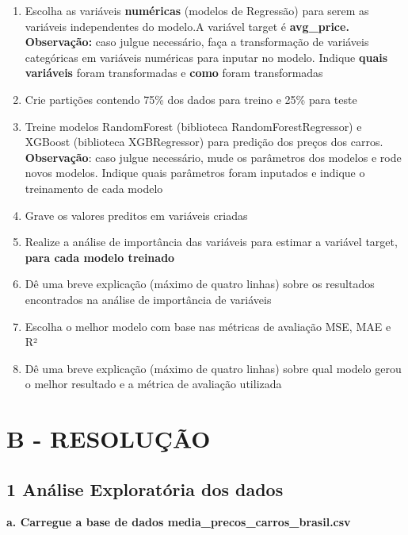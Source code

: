 \begin{enumerate}[series=listWWNumxii,label=\alph*.,ref=\alph*]
\item Escolha as variáveis \textbf{numéricas} (modelos de Regressão) para serem as variáveis independentes do modelo.A
variável target é \textbf{avg\_price. Observação:} caso julgue necessário, faça a transformação de variáveis
categóricas em variáveis numéricas para inputar no modelo. Indique \textbf{quais variáveis} foram transformadas e
\textbf{como} foram transformadas
\item Crie partições contendo 75\% dos dados para treino e 25\% para teste
\item Treine modelos RandomForest (biblioteca RandomForestRegressor) e XGBoost (biblioteca XGBRegressor) para predição
dos preços dos carros. \textbf{Observação}: caso julgue necessário, mude os parâmetros dos modelos e rode novos
modelos. Indique quais parâmetros foram inputados e indique o treinamento de cada modelo
\item Grave os valores preditos em variáveis criadas
\item Realize a análise de importância das variáveis para estimar a variável target, \textbf{para cada modelo treinado}
\item Dê uma breve explicação (máximo de quatro linhas) sobre os resultados encontrados na análise de importância de
variáveis
\item Escolha o melhor modelo com base nas métricas de avaliação MSE, MAE e R²
\item Dê uma breve explicação (máximo de quatro linhas) sobre qual modelo gerou o melhor resultado e a métrica de
avaliação utilizada
\end{enumerate}

\section*{\textbf{B - RESOLUÇÃO}}

\subsection*{\textbf{1 Análise Exploratória dos dados}}
\begin{adjustwidth}{1em}{}
\textbf{a. Carregue a base de dados media\_precos\_carros\_brasil.csv}
\end{adjustwidth}

